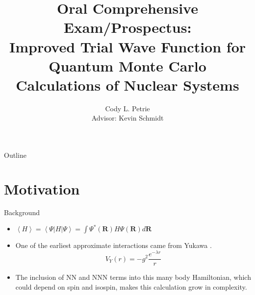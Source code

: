 \documentclass{beamer}
\title[Prospectus]{{\large Oral Comprehensive Exam/Prospectus:}\\Improved Trial Wave Function for Quantum Monte Carlo Calculations of Nuclear Systems}
\author[Cody L. Petrie]{Cody L. Petrie\\
Advisor: Kevin Schmidt}
\institute{Arizona State University}
\newcommand{\R}{\mathbf{R}}
\begin{document}
\begin{frame}
  \titlepage
\end{frame}

\begin{frame}{Outline}
  \tableofcontents
\end{frame}


\section{Motivation}
\begin{frame}{Background}
\begin{itemize}
   \item $\left<H\right> = \left<\Psi\right|H\left|\Psi\right> = \int \Psi^*(\R) H \Psi(\R) d\R$
   \item One of the earliest approximate interactions came from Yukawa .
   \begin{equation*}
      V_{Y}(r)=-g^2\frac{e^{-\lambda r}}{r}
   \end{equation*}
   \item The inclusion of NN and NNN terms into this many body Hamiltonian, which could depend on spin and isospin, makes this calculation grow in complexity.
\end{itemize}
\end{frame}
\end{document}
